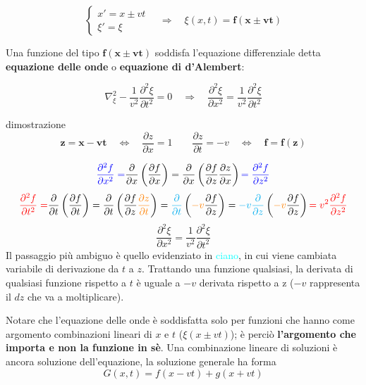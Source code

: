 \documentclass[x11names]{report}
\begin{document}
	\[ 
	\begin{cases} 
		x' = x\pm vt \\ \xi' = \xi 
	\end{cases} 
	\quad \Rightarrow \quad \xi(x,t) = \mathbf{f(x \pm vt)}
	\]
	
	Una funzione del tipo \(\mathbf{f(x \pm vt)}\) soddisfa l'equazione differenziale detta \textbf{equazione delle onde} o \textbf{equazione di d'Alembert}:
	
	\[ 
	\nabla^2_\xi- \frac{1}{v^2} \frac{\partial^2\xi}{\partial t^2} = 0 \quad \Rightarrow \quad \boxed{\frac{\partial^2\xi}{\partial x^2} = \frac{1}{v^2}\frac{\partial^2\xi}{\partial t^2}}
	\]
	
	\begin{es}{dimostrazione}
		\[ 
		\mathbf{z = x - vt} \quad \Longleftrightarrow \quad \boxed{\frac{\partial z}{\partial x} = 1}   \quad \quad \boxed{\frac{\partial z}{\partial t} = -v}  \quad \Longleftrightarrow \quad  \mathbf{f = f(z)}
		\]
		
		\[ 
		\textcolor{blue}{\frac{\partial^2 f}{\partial x^2} =} \frac{\partial}{\partial x}\left(\frac{\partial f}{\partial x}\right) =\frac{\partial}{\partial x}\left(\frac{\partial f}{\partial z}\frac{\partial z}{\partial x}\right)  \textcolor{blue}{=\frac{\partial^2 f}{\partial z^2}}
		\]
		\[ 
		\textcolor{red}{\frac{\partial^2 f}{\partial t^2} =} \frac{\partial}{\partial t}\left(\frac{\partial f}{\partial t}\right) =\frac{\partial}{\partial t}\left(\frac{\partial f}{\partial z}\textcolor{orange}{\frac{\partial z}{\partial t}}\right) =\textcolor{cyan}{\frac{\partial}{\partial t}}\left(\textcolor{orange}{-v}\frac{\partial f}{\partial z}\right) = \textcolor{cyan}{-v\frac{\partial }{\partial z}}\left(\textcolor{orange}{-v}\frac{\partial f}{\partial z}\right) \textcolor{red}{=v^2\frac{\partial^2 f}{\partial z^2}}
		\]
		\[ 
		\frac{\partial^2\xi}{\partial x^2} = \frac{1}{v^2}\frac{\partial^2\xi}{\partial t^2}
		\]
		\newline
		Il passaggio più ambiguo è quello evidenziato in \textcolor{cyan}{ciano}, in cui viene cambiata variabile di derivazione da \(t\) a \(z\). Trattando una funzione qualsiasi, la derivata di qualsiasi funzione rispetto a \(t\) è uguale a \(-v\) derivata rispetto a z (\(-v\) rappresenta il \(dz\) che va a moltiplicare). 
	\end{es}	
	
	\noindent
	Notare che l'equazione delle onde è soddisfatta solo per funzioni che hanno come argomento combinazioni lineari di \(x\) e \(t\) (\(\xi(x \pm vt)\)); è perciò \textbf{l'argomento che importa e non la funzione in sè}. Una combinazione lineare di soluzioni è ancora soluzione dell'equazione, la soluzione generale ha forma
	\[ 
	G(x,t) = f(x-vt) + g(x+vt)
	\]
	
\end{document}
